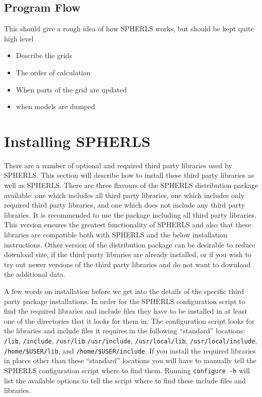 \documentclass[12pt,a4paper]{book}
\begin{document}
\section{Program Flow}
This should give a rough idea of how SPHERLS works, but should be kept quite high level
\begin{itemize}
\item Describe the grids
\item The order of calculation
\item When parts of the grid are updated
\item when models are dumped
\end{itemize}

\chapter{Installing SPHERLS}

There are a number of optional and required third party libraries used by SPHERLS. This section will describe how to install these third party libraries as well as SPHERLS. There are three flavours of the SPHERLS distribution package available: one which includes all third party libraries, one which includes only required third party libraries, and one which does not include any third party libraries. It is recommended to use the package including all third party libraries. This version ensures the greatest functionality of SPHERLS and also that these libraries are compatible both with SPHERLS and the below installation instructions. Other version of the distribution package can be desirable to reduce download size, if the third party libraries are already installed, or if you wish to try out newer versions of the third party libraries and do not want to download the additional data.

A few words on installation before we get into the details of the specific third party package installations. In order for the SPHERLS configuration script to find the required libraries and include files they have to be installed in at least one of the directories that it looks for them in. The configuration script looks for the libraries and include files it requires in the following ``standard'' locations: {\tt /lib}, {\tt /include}, {\tt /usr/\-lib} {\tt /usr/\-include}, {\tt /usr/local/lib}, {\tt /usr/\-local/\-include}, {\tt /home/\-\$USER/\-lib}, and {\tt /home/\-\$USER/\-include}. If you install the required libraries in places other than these ``standard'' locations you will have to manually tell the SPHERLS configuration script where to find them. Running {\tt configure -h} will list the available options to tell the script where to find these include files and libraries.
\end{document}
